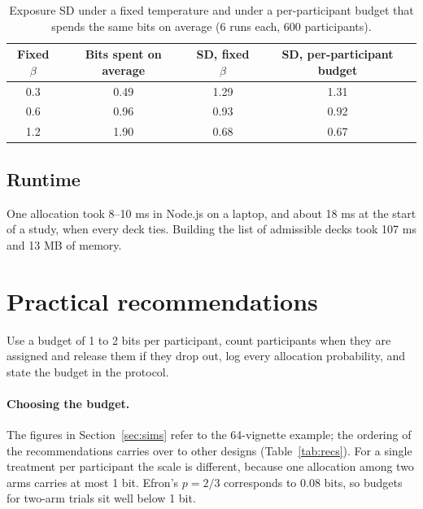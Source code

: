 \documentclass[11pt]{article}
\begin{document}
\begin{table}[ht]
\centering\small
\caption{Exposure SD under a fixed temperature and under a per-participant budget that spends the same bits on average (6 runs each, 600 participants).}\label{tab:mode}
\begin{tabular}{@{}cccc@{}}
\toprule
Fixed $\beta$ & Bits spent on average & SD, fixed $\beta$ & SD, per-participant budget \\
\midrule
0.3 & 0.49 & 1.29 & 1.31 \\
0.6 & 0.96 & 0.93 & 0.92 \\
1.2 & 1.90 & 0.68 & 0.67 \\
\bottomrule
\end{tabular}
\end{table}

\subsection{Runtime}

One allocation took 8--10 ms in Node.js on a laptop, and about 18 ms at the start of a study, when every deck ties. Building the list of admissible decks took 107 ms and 13 MB of memory.

\section{Practical recommendations}\label{sec:recs}

Use a budget of 1 to 2 bits per participant, count participants when they are assigned and release them if they drop out, log every allocation probability, and state the budget in the protocol.

\paragraph{Choosing the budget.} The figures in Section~\ref{sec:sims} refer to the 64-vignette example; the ordering of the recommendations carries over to other designs (Table~\ref{tab:recs}). For a single treatment per participant the scale is different, because one allocation among two arms carries at most 1 bit. Efron's $p=2/3$ corresponds to 0.08 bits, so budgets for two-arm trials sit well below 1 bit.
\end{document}
